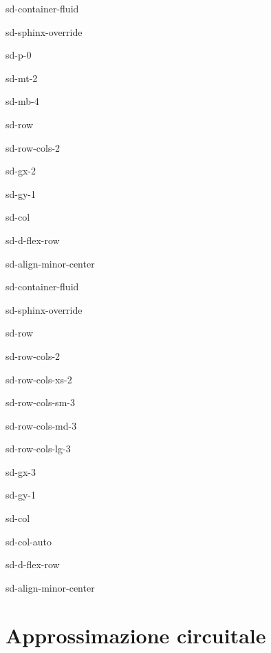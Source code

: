 \documentclass[letterpaper,10pt,english]{jupyterBook}
\begin{document}
\begin{sphinxuseclass}{sd-container-fluid}
\begin{sphinxuseclass}{sd-sphinx-override}
\begin{sphinxuseclass}{sd-p-0}
\begin{sphinxuseclass}{sd-mt-2}
\begin{sphinxuseclass}{sd-mb-4}
\begin{sphinxuseclass}{sd-row}
\begin{sphinxuseclass}{sd-row-cols-2}
\begin{sphinxuseclass}{sd-gx-2}
\begin{sphinxuseclass}{sd-gy-1}
\begin{sphinxuseclass}{sd-col}
\begin{sphinxuseclass}{sd-d-flex-row}
\begin{sphinxuseclass}{sd-align-minor-center}
\begin{sphinxuseclass}{sd-container-fluid}
\begin{sphinxuseclass}{sd-sphinx-override}
\begin{sphinxuseclass}{sd-row}
\begin{sphinxuseclass}{sd-row-cols-2}
\begin{sphinxuseclass}{sd-row-cols-xs-2}
\begin{sphinxuseclass}{sd-row-cols-sm-3}
\begin{sphinxuseclass}{sd-row-cols-md-3}
\begin{sphinxuseclass}{sd-row-cols-lg-3}
\begin{sphinxuseclass}{sd-gx-3}
\begin{sphinxuseclass}{sd-gy-1}
\begin{sphinxuseclass}{sd-col}
\begin{sphinxuseclass}{sd-col-auto}
\begin{sphinxuseclass}{sd-d-flex-row}
\begin{sphinxuseclass}{sd-align-minor-center}
\end{sphinxuseclass}
\end{sphinxuseclass}
\end{sphinxuseclass}
\end{sphinxuseclass}
\end{sphinxuseclass}
\end{sphinxuseclass}
\end{sphinxuseclass}
\end{sphinxuseclass}
\end{sphinxuseclass}
\end{sphinxuseclass}
\end{sphinxuseclass}
\end{sphinxuseclass}
\end{sphinxuseclass}
\end{sphinxuseclass}
\end{sphinxuseclass}
\end{sphinxuseclass}
\end{sphinxuseclass}
\end{sphinxuseclass}
\end{sphinxuseclass}
\end{sphinxuseclass}
\end{sphinxuseclass}
\end{sphinxuseclass}
\end{sphinxuseclass}
\end{sphinxuseclass}
\end{sphinxuseclass}
\end{sphinxuseclass}

\chapter{Approssimazione circuitale}
\label{\detokenize{ch/circuits:approssimazione-circuitale}}\label{\detokenize{ch/circuits:classical-electromagnetism-circuits}}\label{\detokenize{ch/circuits::doc}}
\sphinxAtStartPar
{} 
\end{document}
